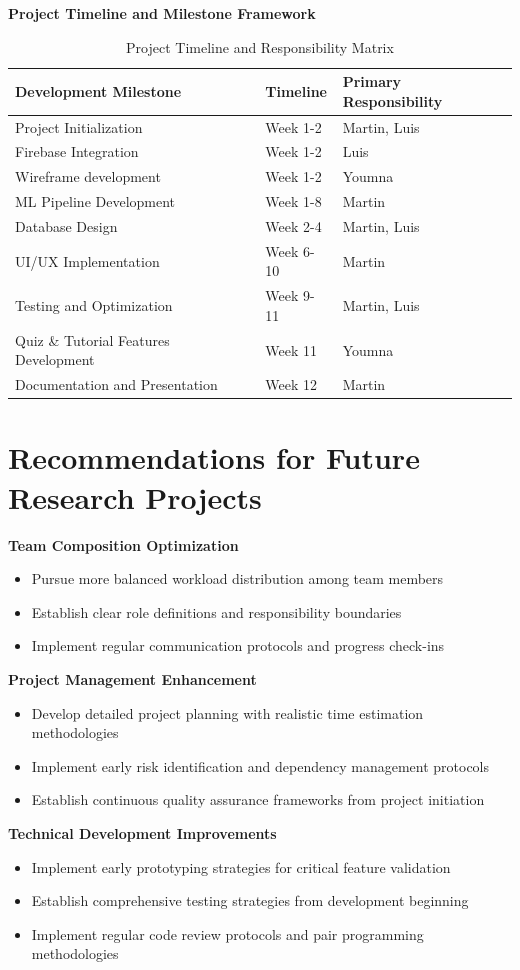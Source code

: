 \textbf{Project Timeline and Milestone Framework}
\begin{table}[H]
\centering
\begin{tabular}{|l|l|l|}
\hline
\textbf{Development Milestone} & \textbf{Timeline} & \textbf{Primary Responsibility} \\
\hline
Project Initialization & Week 1-2 & Martin, Luis \\
Firebase Integration & Week 1-2 & Luis \\
Wireframe development & Week 1-2 & Youmna \\
ML Pipeline Development & Week 1-8 & Martin \\
Database Design & Week 2-4 & Martin, Luis \\
UI/UX Implementation & Week 6-10 & Martin \\
Testing and Optimization & Week 9-11 & Martin, Luis \\
Quiz \& Tutorial Features Development & Week 11 & Youmna \\
Documentation and Presentation & Week 12 & Martin \\
\hline
\end{tabular}
\caption{Project Timeline and Responsibility Matrix}
\label{tab:project_timeline}
\end{table}

\section{Recommendations for Future Research Projects}

\textbf{Team Composition Optimization}
\begin{itemize}
    \item Pursue more balanced workload distribution among team members
    \item Establish clear role definitions and responsibility boundaries
    \item Implement regular communication protocols and progress check-ins
\end{itemize}

\textbf{Project Management Enhancement}
\begin{itemize}
    \item Develop detailed project planning with realistic time estimation methodologies
    \item Implement early risk identification and dependency management protocols
    \item Establish continuous quality assurance frameworks from project initiation
\end{itemize}

\textbf{Technical Development Improvements}
\begin{itemize}
    \item Implement early prototyping strategies for critical feature validation
    \item Establish comprehensive testing strategies from development beginning
    \item Implement regular code review protocols and pair programming methodologies
\end{itemize}